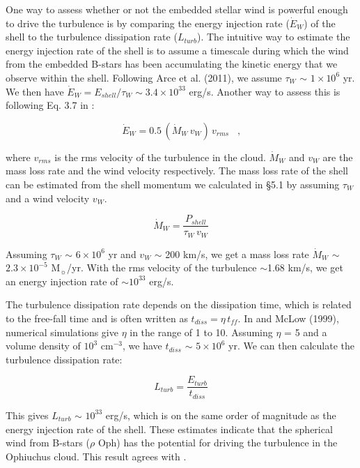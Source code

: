 \documentclass[11pt,a4paper]{emulateapj}
\begin{document}
One way to assess whether or not the embedded stellar wind is powerful enough to drive the turbulence is by comparing the energy injection rate ($\dot E_W$) of the shell to the turbulence dissipation rate ($L_{turb}$). The intuitive way to estimate the energy injection rate of the shell is to assume a timescale during which the wind from the embedded B-stars has been accumulating the kinetic energy that we observe within the shell. Following Arce et al. (2011), we assume $\tau_W$ $\sim$ $1\times10^6$ yr. We then have $\dot E_W = E_{shell}/\tau_W \sim 3.4\times10^{33}$ erg/s. Another way to assess this is following Eq. 3.7 in \citet{McKee_1989}:

\begin{equation}
\dot E_W = 0.5\,(\dot M_W\,v_W)\,v_{rms}\;\;\;\text{,}
\end{equation}

where $v_{rms}$ is the rms velocity of the turbulence in the cloud. $\dot M_W$ and $v_W$ are the mass loss rate and the wind velocity respectively. The mass loss rate of the shell can be estimated from the shell momentum we calculated in \S5.1 by assuming $\tau_W$ and a wind velocity $v_W$.

\begin{equation}
\dot M_W = \frac{P_{shell}}{\tau_W\,v_W}
\end{equation}

Assuming $\tau_W$ $\sim$ $6\times10^6$ yr and $v_W$ $\sim$ 200 km/s, we get a mass loss rate $\dot M_W$ $\sim$ $2.3\times10^{-5}$ M$_{\sun}$/yr. With the rms velocity of the turbulence $\sim$1.68 km/s, we get an energy injection rate of $\sim$$10^{33}$ erg/s.

The turbulence dissipation rate depends on the dissipation time, which is related to the free-fall time and is often written as $t_{diss} = \eta\,t_{ff}$. In \citet{McKee_1989} and McLow (1999), numerical simulations give $\eta$ in the range of 1 to 10. Assuming $\eta$ = 5 and a volume density of $10^3$ cm$^{-3}$, we have $t_{diss}$ $\sim$ $5\times10^6$ yr. We can then calculate the turbulence dissipation rate:

\begin{equation}
L_{turb} = \frac{E_{turb}}{t_{diss}}
\end{equation}

This gives $L_{turb}$ $\sim$ $10^{33}$ erg/s, which is on the same order of magnitude as the energy injection rate of the shell. These estimates indicate that the spherical wind from B-stars ($\rho$ Oph) has the potential for driving the turbulence in the Ophiuchus cloud. This result agrees with \citet{Arce_2011}.
\end{document}
